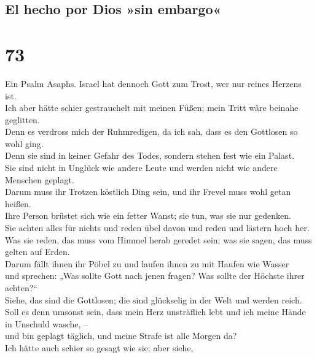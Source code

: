 \hypertarget{el-hecho-por-dios-sin-embargo}{%
\subsection{El hecho por Dios »sin
embargo«}\label{el-hecho-por-dios-sin-embargo}}

\hypertarget{section-72}{%
\section{73}\label{section-72}}

 Ein Psalm Asaphs. Israel hat dennoch Gott zum Trost, wer
nur reines Herzens ist.\\
 Ich aber hätte schier gestrauchelt mit meinen Füßen; mein
Tritt wäre beinahe geglitten.\\
 Denn es verdross mich der Ruhmredigen, da ich sah, dass
es den Gottlosen so wohl ging.\\
 Denn sie sind in keiner Gefahr des Todes, sondern stehen
fest wie ein Palast.\\
 Sie sind nicht in Unglück wie andere Leute und werden
nicht wie andere Menschen geplagt.\\
 Darum muss ihr Trotzen köstlich Ding sein, und ihr Frevel
muss wohl getan heißen.\\
 Ihre Person brüstet sich wie ein fetter Wanst; sie tun,
was sie nur gedenken.\\
 Sie achten alles für nichts und reden übel davon und
reden und lästern hoch her.\\
 Was sie reden, das muss vom Himmel herab geredet sein;
was sie sagen, das muss gelten auf Erden.\\
 Darum fällt ihnen ihr Pöbel zu und laufen ihnen zu mit
Haufen wie Wasser\\
 und sprechen: „Was sollte Gott nach jenen fragen? Was
sollte der Höchste ihrer achten?{}``\\
 Siehe, das sind die Gottlosen; die sind glückselig in
der Welt und werden reich.\\
 Soll es denn umsonst sein, dass mein Herz unsträflich
lebt und ich meine Hände in Unschuld wasche, --\\
 und bin geplagt täglich, und meine Strafe ist alle
Morgen da?\\
 Ich hätte auch schier so gesagt wie sie; aber siehe,
